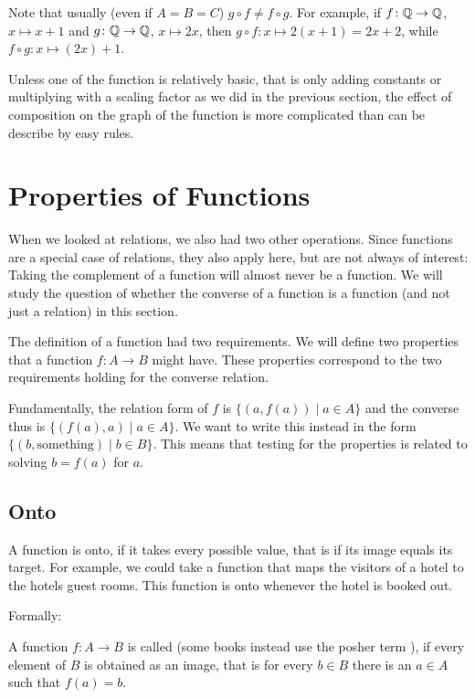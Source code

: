 Note that usually (even if $A=B=C$) $g\circ f\not=f\circ g$. For example, if
$f\colon{\mathbb Q}\to{\mathbb Q}$, $x\mapsto x+1$ and 
$g\colon{\mathbb Q}\to{\mathbb Q}$, $x\mapsto 2x$, then $g\circ f\colon x\mapsto 2(x+1)=2x+2$, while
$f\circ g\colon x\mapsto (2x)+1$.
\smallskip

Unless one of the function is relatively basic, that is only adding constants or multiplying with a scaling factor as we did
in the previous section, the effect of composition on the graph of the function is more
complicated than can be describe by easy rules.

\section{Properties of Functions}

When we looked at relations, we also had two other operations. Since functions are a
special case of relations, they also apply here, but are not always of interest: 
Taking the complement of a function will almost never be a function. We will study the
question of whether the converse of a function is a function (and not just a relation)
in this section.
\medskip

The definition of a function had two requirements. We will define two properties that a
function $f\colon A\to B$ might have. These properties correspond to the two requirements holding for the converse relation.

Fundamentally, the relation form of $f$ is $\{(a,f(a))\mid a\in A\}$ and the converse
thus is $\{(f(a),a)\mid a\in A\}$. We want to write this instead in
the form $\{(b,\mbox{something})\mid b\in B\}$. This means that testing for the properties
is related to solving $b=f(a)$ for $a$.

\subsection{Onto}

A function is onto, if it takes every possible value, that is if its image
equals its target.
For example, we could take a function that maps the visitors of a hotel to
the hotels guest rooms. This function is onto whenever the hotel is booked
out.

Formally:
\begin{defn}
A function $f\colon A\to B$ is called  (some books instead use the posher
term ), if every element of $B$ is obtained as an image, that is for every $b\in B$ there is an $a\in A$ such that $f(a)=b$.
\end{defn}

